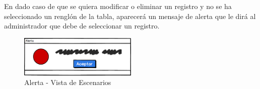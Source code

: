 En dado caso de que se quiera modificar o eliminar un registro y no se ha seleccionado un renglón de la tabla, aparecerá un mensaje de alerta que le dirá al administrador que debe de seleccionar un registro.
\begin{figure}[!h]
	\centering
	\includegraphics[width=0.5\textwidth]{./diseno/vescenarios/imagenes/alerta}
	\caption{Alerta - Vista de Escenarios}
	\label{fig:Alerta Empleados - Vista de Escenarios}
\end{figure}
\clearpage